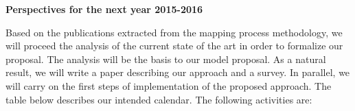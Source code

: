 \documentclass[12pt,a4paper,oneside]{report}
\begin{document}

\begin{flushleft}
\textbf{Perspectives for the next year 2015-2016}\\
\end{flushleft}
Based on the publications extracted from the mapping process methodology, we will proceed the analysis of the current state of the art in order to formalize our proposal. The analysis will be the basis to our model proposal. As a natural result, we will write a paper describing our approach and a survey. In parallel, we will carry on the first steps of implementation of the proposed approach.
The table below describes our intended calendar. The following activities are:
\end{document}

